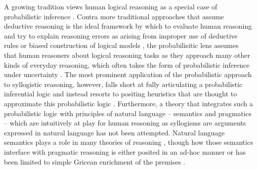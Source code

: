 \documentclass[floatsintext, doc]{apa6}
\newcommand{\mht}[1]{{\textcolor{Blue}{[mht: #1]}}}
\begin{document}

A growing tradition views human logical reasoning as a special case of probabilistic inference \cite{oaksford2001probabilistic, oaksford2007bayesian, hahn2007rationality, tenenbaum2006theory}.
Contra more traditional approaches that  assume deductive reasoning is the ideal framework by which to evaluate human reasoning  and try to explain reasoning errors as arising from improper use of deductive rules \cite{rips1994, geurts2003reasoning} or biased construction of logical models \cite{JL1984, Newstead1992}, the probabilisitic lens assumes that human reasoners about logical reasoning tasks as they approach many other kinds of everyday reasoning, which often takes the form of probabilistic inference under uncertainty \cite{tenenbaum2006theory}. 
The most prominent application of the probabilistic approach to syllogistic reasoning, however, falls short at fully articulating a probabilistic inferential logic and instead resorts to positing heuristics that are thought to approximate this probabilistic logic \cite{Chater1999}.
Furthermore, a theory that integrates such a probabilistic logic with principles of natural language -- semantics and pragmatics -- which are intuitively at play for human reasoning as syllogisms are arguments expressed in natural language has not been attempted.
Natural language semantics plays a role in many theories of reasoning \cite{JL1978, Khemlani2012, geurts2003reasoning}, though how those semantics interface with pragmatic reasoning  is either posited in an ad-hoc manner \cite{Chater1999} or has been limited to simple Gricean enrichment of the premises \cite{Roberts2001}.	

\end{document}
